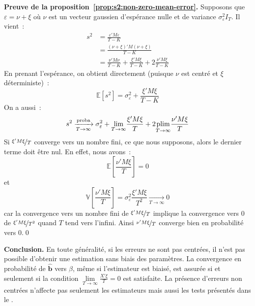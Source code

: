 \documentclass[10pt]{beamer}
\begin{document}
\begin{notes}
  \textbf{Preuve de la proposition~\ref{prop:s2:non-zero-mean-error}.} Supposons que $\varepsilon = \nu + \xi$ où $\nu$ est un vecteur gaussien d'espérance nulle et de variance $\sigma_{\varepsilon}^2I_T$. Il vient~:
  \[
    \begin{split}
      s^2 &= \frac{\varepsilon'M\varepsilon}{T-K}\\
          &= \frac{\left(\nu+\xi\right)'M\left(\nu+\xi\right)}{T-K}\\
          &= \frac{\nu'M\nu}{T-K} + \frac{\xi'M\xi}{T-K} + 2\frac{\nu'M\xi}{T-K}
    \end{split}
  \]
  En prenant l'espérance, on obtient directement (puisque $\nu$ est centré et $\xi$ déterministe)~:
  \[
    \mathbb E\left[ s^2 \right] = \sigma_{\varepsilon}^2 + \frac{\xi'M\xi}{T-K}
  \]
  On a aussi~:
  \[
    s^2 \xrightarrow[T\rightarrow\infty]{\text{proba}} \sigma_{\varepsilon}^2 + \underset{T\rightarrow\infty}{\lim}\frac{\xi'M\xi}{T} + 2\underset{T\rightarrow\infty}{\text{plim}}\frac{\nu'M\xi}{T}
  \]
  Si $\nicefrac{\xi'M\xi}{T}$ converge vers un nombre fini, ce que nous supposons, alors le dernier terme doit être nul. En effet, nous avons~:
  \[
    \mathbb E\left[ \frac{\nu'M\xi}{T} \right] = 0
  \]
  et
  \[
    \mathbb V\left[ \frac{\nu'M\xi}{T} \right] = \sigma_{\varepsilon}^2 \frac{\xi'M\xi}{T^2} \underset{T\rightarrow\infty}{\longrightarrow} 0
    \]
    car la convergence vers un nombre fini de $\nicefrac{\xi'M\xi}{T}$ implique la convergence vers 0 de $\nicefrac{\xi'M\xi}{T^2}$ quand $T$ tend vers l'infini. Ainsi $\nicefrac{\nu'M\xi}{T}$ converge bien en probabilité vers 0.\qed

    \bigskip

    \textbf{Conclusion.} En toute généralité, si les erreurs ne sont pas centrées, il n'est pas possible d'obtenir une estimation sans biais des paramètres. La convergence en probabilité de $\hat{\mathbf b}$ vers $\beta$, même si l'estimateur est biaisé, est assurée si et seulement si la condition $\underset{T\rightarrow\infty}{\lim}\frac{X'\xi}{T}=0$ est satisfaite. La présence d'erreurs non centrées n'affecte pas seulement les estimateurs mais aussi les tests présentés dans le .

\end{notes}
\end{document}
